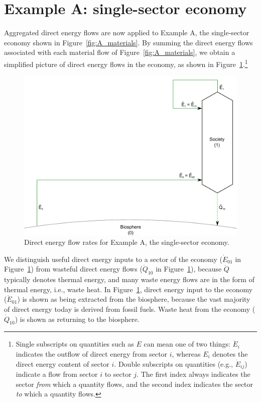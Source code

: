 \section{Example A: single-sector economy}
\label{sec:A_energy}

Aggregated direct energy flows are now applied to Example A, 
the single-sector economy shown in Figure~\ref{fig:A_materials}.
By summing the direct energy flows associated with
each material flow of Figure~\ref{fig:A_materials}, we obtain
a simplified picture of direct energy flows in the economy,
as shown in Figure~\ref{fig:A_energy}.\footnote{Single 
subscripts on quantities such as
$E$ can mean one of two things: 
$\dot{E}_{i}$ indicates the outflow of direct energy from sector $i$, 
whereas $E_{i}$ denotes the direct energy content of sector $i$. 
Double subscripts on quantities
(e.g., $\dot{E}_{ij}$) indicate a flow 
from sector $i$ to sector $j$. 
The first index always indicates the sector \emph{from} which a quantity flows, 
and the second index indicates the sector \emph{to} which a quantity flows.}

\begin{figure}[h!]
\centering
\includegraphics[width=0.8\linewidth]{Part_2/Chapter_Energy/images/1_sector_direct_energy.pdf}
\caption{Direct energy flow rates for Example A, the single-sector economy.}
\label{fig:A_energy}
\end{figure}

We distinguish useful direct energy inputs to a sector of the economy
($\dot{E}_{01}$ in Figure~\ref{fig:A_energy}) from wasteful direct energy flows 
($\dot{Q}_{10}$ in Figure~\ref{fig:A_energy}), 
because $\dot{Q}$ typically denotes thermal energy, 
and many waste energy flows are in the form of thermal
energy, i.e., waste heat. In Figure~\ref{fig:A_energy}, direct energy input to the 
economy ($\dot{E}_{01}$) is shown as being extracted from the biosphere, because
the vast majority of direct energy today is derived from fossil fuels.
Waste heat from the economy ($\dot{Q}_{10}$) is shown as returning 
to the biosphere.

